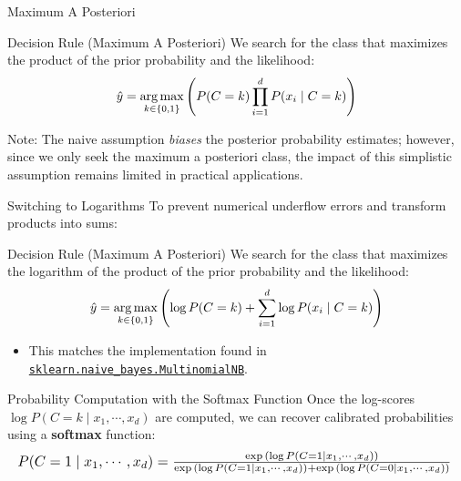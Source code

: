 \begin{frame}{Maximum A Posteriori}
	\begin{block}{Decision Rule (Maximum A Posteriori)}
		We search for the class that maximizes the product of the prior probability and the likelihood:
		\begin{equation}
			\hat{y} = \underset{k \in \{0, 1\}}{\operatorname{arg\,max}} \left( P(C = k) \prod_{i=1}^{d} P(x_i \mid C = k) \right)
			\nonumber
		\end{equation}
	\end{block}
	\pause
	Note: The naive assumption \textit{biases} the posterior probability estimates; however, since we only seek the maximum a posteriori class, the impact of this simplistic assumption remains limited in practical applications.
\end{frame}

\begin{frame}{Switching to Logarithms}
	To prevent numerical underflow errors and transform products into sums:
	\begin{block}{Decision Rule (Maximum A Posteriori)}
		We search for the class that maximizes the logarithm of the product of the prior probability and the likelihood:
		\begin{equation}
			\hat{y} = \underset{k \in \{0, 1\}}{\operatorname{arg\,max}} \left( \log P(C = k) + \sum_{i=1}^{d} \log P(x_i \mid C = k) \right)
			\nonumber
		\end{equation}
	\end{block}
	\pause
	\begin{itemize}
		\item This matches the implementation found in \href{https://scikit-learn.org/stable/modules/generated/sklearn.naive_bayes.MultinomialNB.html}{\texttt{sklearn.naive\_bayes.MultinomialNB}}.
	\end{itemize}
\end{frame}

\begin{frame}{Probability Computation with the Softmax Function}
	Once the log-scores $\log P(C = k \mid x_1, \cdots, x_d)$ are computed, we can recover calibrated probabilities using a \textbf{softmax} function:
	\begin{equation}
		\resizebox{1.0\textwidth}{!}{%
			$P(C = 1 \mid x_1, \cdots, x_d) = \frac{\exp{\left(\log P(C = 1  \mid x_1, \cdots, x_d)\right)}}{\exp{\left(\log P(C = 1  \mid x_1, \cdots, x_d)\right)} + \exp{\left(\log P(C = 0  \mid x_1, \cdots, x_d)\right)}}$
		}
		\nonumber
	\end{equation}
\end{frame}

